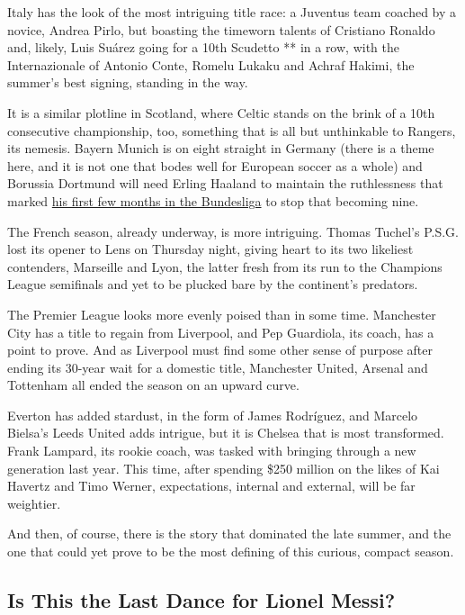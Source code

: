 Italy has the look of the most intriguing title race: a Juventus team
coached by a novice, Andrea Pirlo, but boasting the timeworn talents of
Cristiano Ronaldo and, likely, Luis Suárez going for a 10th Scudetto **
in a row, with the Internazionale of Antonio Conte, Romelu Lukaku and
Achraf Hakimi, the summer's best signing, standing in the way.

It is a similar plotline in Scotland, where Celtic stands on the brink
of a 10th consecutive championship, too, something that is all but
unthinkable to Rangers, its nemesis. Bayern Munich is on eight straight
in Germany (there is a theme here, and it is not one that bodes well for
European soccer as a whole) and Borussia Dortmund will need Erling
Haaland to maintain the ruthlessness that marked
\href{https://www.nytimes3xbfgragh.onion/2020/02/18/sports/soccer/dortmund-psg-haaland.html}{his
first few months in the Bundesliga} to stop that becoming nine.

The French season, already underway, is more intriguing. Thomas Tuchel's
P.S.G. lost its opener to Lens on Thursday night, giving heart to its
two likeliest contenders, Marseille and Lyon, the latter fresh from its
run to the Champions League semifinals and yet to be plucked bare by the
continent's predators.

The Premier League looks more evenly poised than in some time.
Manchester City has a title to regain from Liverpool, and Pep Guardiola,
its coach, has a point to prove. And as Liverpool must find some other
sense of purpose after ending its 30-year wait for a domestic title,
Manchester United, Arsenal and Tottenham all ended the season on an
upward curve.

Everton has added stardust, in the form of James Rodríguez, and Marcelo
Bielsa's Leeds United adds intrigue, but it is Chelsea that is most
transformed. Frank Lampard, its rookie coach, was tasked with bringing
through a new generation last year. This time, after spending \$250
million on the likes of Kai Havertz and Timo Werner, expectations,
internal and external, will be far weightier.

And then, of course, there is the story that dominated the late summer,
and the one that could yet prove to be the most defining of this
curious, compact season.

\hypertarget{is-this-the-last-dance-for-lionel-messi}{%
\subsection{Is This the Last Dance for Lionel
Messi?}\label{is-this-the-last-dance-for-lionel-messi}}


